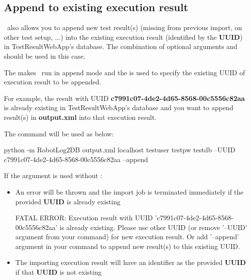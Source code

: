   \subsection{Append to existing execution result}\label{append-to-existing-execution-result}
    \pkg\ also allows you to append new test result(s) (missing from previous 
    import, on other test setup, ...) into the existing execution result 
    (identified by the \textbf{UUID}) in TestResultWebApp's database. 
    The combination of optional arguments  and 
     should be used in this case.
    
    The  makes \pkg\ run in append mode and the  
    is used to specify the existing UUID of execution result to be appended.
    
    For example, the result with UUID \textbf{c7991c07-4de2-4d65-8568-00c5556c82aa} 
    is already existing in TestResultWebApp's database and you want to append
    result(s) in \textbf{output.xml} into that execution result.
    
    The command will be used as below:
\begin{robotlog}
python -m RobotLog2DB output.xml localhost testuser testpw testdb --UUID c7991c07-4de2-4d65-8568-00c5556c82aa --append
\end{robotlog}
    
    If the argument  is used without :
    \begin{itemize}
      \item An error will be thrown and the import job is terminated immediately 
            if the provided \textbf{UUID} is already existing
    
\begin{robotlog}
FATAL ERROR: Execution result with UUID 'c7991c07-4de2-4d65-8568-00c5556c82aa' is already existing.
             Please use other UUID (or remove '--UUID' argument from your command) for new execution result.
             Or add '--append' argument in your command to append new result(s) to this existing UUID.
\end{robotlog}
      \item The importing execution result will have an identifier as the 
            provided \textbf{UUID} if that \textbf{UUID} is not existing
    \end{itemize}
    
